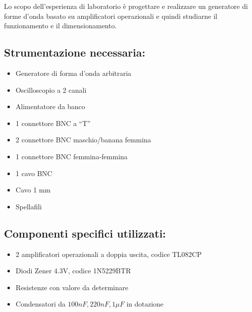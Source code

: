 Lo scopo dell'esperienza di laboratorio è progettare e realizzare un generatore di forme d'onda basato su amplificatori operazionali e quindi studiarne il funzionamento e il dimensionamento.
\subsection*{Strumentazione necessaria:}
\begin{itemize}
    \item Generatore di forma d'onda arbitraria
    \item Oscilloscopio a 2 canali
    \item Alimentatore da banco
    \item 1 connettore BNC a “T”
    \item 2 connettore BNC maschio/banana femmina
    \item 1 connettore BNC femmina-femmina
    \item 1 cavo BNC
    \item Cavo 1 mm
    \item Spellafili
\end{itemize}
\subsection*{Componenti specifici utilizzati:}
\begin{itemize}
    \item 2 amplificatori operazionali a doppia uscita, codice TL082CP
    \item Diodi Zener 4.3V, codice 1N5229BTR
    \item Resistenze con valore da determinare
    \item Condensatori da $100nF,220nF,1\mu F$ in dotazione
\end{itemize}